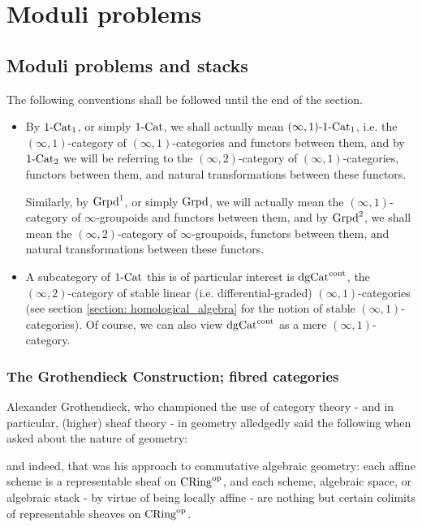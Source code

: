 \chapter{Moduli problems}
    \begin{abstract}
        
    \end{abstract}
    
    \minitoc
    
    \section{Moduli problems and stacks} \label{section: moduli_problems}
        The following conventions shall be followed until the end of the section.
        \begin{convention}
            \noindent
            \begin{itemize}
                \item By $1\text{-}\mathrm{Cat}_1$, or simply $1\text{-}\mathrm{Cat}$, we shall actually mean $(\infty, 1)\text{-}1\text{-}\mathrm{Cat}_1$, i.e. the $(\infty, 1)$-category of $(\infty, 1)$-categories and functors between them, and by $1\text{-}\mathrm{Cat}_2$ we will be referring to the $(\infty, 2)$-category of $(\infty, 1)$-categories, functors between them, and natural transformations between these functors. 
                
                Similarly, by $\mathrm{Grpd}^1$, or simply $\mathrm{Grpd}$, we will actually mean the $(\infty, 1)$-category of $\infty$-groupoids and functors between them, and by $\mathrm{Grpd}^2$, we shall mean the $(\infty, 2)$-category of $\infty$-groupoids, functors between them, and natural transformations between these functors.
                \item A subcategory of $1\text{-}\mathrm{Cat}$ this is of particular interest is $\mathrm{dg}\mathrm{Cat}^{\mathrm{cont}}$, the $(\infty, 2)$-category of stable linear (i.e. differential-graded) $(\infty, 1)$-categories (see section \ref{section: homological_algebra} for the notion of stable $(\infty, 1)$-categories). Of course, we can also view $\mathrm{dg}\mathrm{Cat}^{\mathrm{cont}}$ as a mere $(\infty, 1)$-category.
            \end{itemize} 
        \end{convention}
    
        \subsection{The Grothendieck Construction; fibred categories}
            Alexander Grothendieck, who championed the use of category theory - and in particular, (higher) sheaf theory - in geometry alledgedly said the following when asked about the nature of geometry:
                \begin{center}
                \end{center}
            and indeed, that was his approach to commutative algebraic geometry: each affine scheme is a representable sheaf on $\mathrm{CRing}^{\mathrm{op}}$, and each scheme, algebraic space, or algebraic stack - by virtue of being locally affine - are nothing but certain colimits of representable sheaves on $\mathrm{CRing}^{\mathrm{op}}$. 
            
